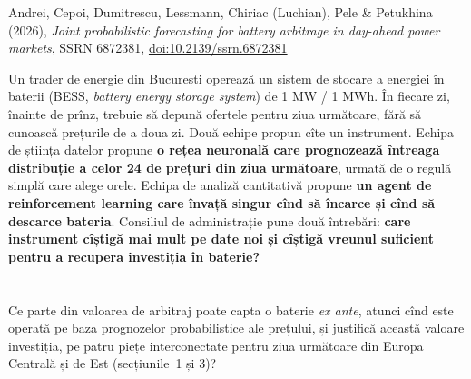 
\renewcommand{\emqacase}{\T{Research case 4 (Lectures 10 and 13)}{Studiul de caz 4 (cursurile 10 și 13)}}

%
          { Andrei, Cepoi, Dumitrescu, Lessmann, Chiriac (Luchian), Pele \& Petukhina (2026), \emph{Joint probabilistic forecasting for battery arbitrage in day-ahead power markets},
           SSRN 6872381, \href{https://doi.org/10.2139/ssrn.6872381}{doi:10.2139/ssrn.6872381}}

\begin{scenario}
%
{Un trader de energie din București operează un sistem de stocare a energiei în baterii (BESS, \emph{battery energy storage system}) de 1 MW / 1 MWh. În fiecare zi, înainte de prînz, trebuie să depună ofertele pentru ziua următoare, fără să cunoască prețurile de a doua zi.
Două echipe propun cîte un instrument. Echipa de știința datelor propune \textbf{o rețea neuronală care prognozează întreaga distribuție a celor 24 de prețuri din ziua următoare}, urmată de o regulă simplă care alege orele.
Echipa de analiză cantitativă propune \textbf{un agent de reinforcement learning care învață singur cînd să încarce și cînd să descarce bateria}.
Consiliul de administrație pune două întrebări: \textbf{care instrument cîștigă mai mult pe date noi și cîștigă vreunul suficient pentru a recupera investiția în baterie?}}
\end{scenario}

\section{}
\textbf{} %
{Ce parte din valoarea de arbitraj poate capta o baterie \emph{ex ante}, atunci cînd este operată pe baza prognozelor probabilistice ale prețului, și justifică această valoare investiția, pe patru piețe interconectate pentru ziua următoare din Europa Centrală și de Est (secțiunile~1 și 3)?}

